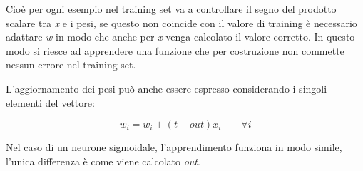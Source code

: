 Cioè per ogni esempio nel training set va a controllare il segno del
prodotto scalare tra \emph{x} e i pesi, se questo non coincide con il
valore di training è necessario adattare \emph{w} in modo che anche per
\emph{x} venga calcolato il valore corretto.
In questo modo si riesce ad apprendere una funzione che per costruzione
non commette nessun errore nel training set.

L'aggiornamento dei pesi può anche essere espresso considerando i singoli elementi del vettore:

$$
w_i = w_i + (t - out)x_i \qquad \forall i
$$

Nel caso di un neurone sigmoidale, l'apprendimento funziona in modo simile, l'unica differenza è come viene calcolato \textit{out}.